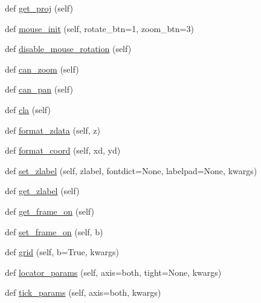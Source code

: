 \begin{DoxyCompactItemize}
\item 
def \hyperlink{classmplot3d_1_1axes3d_1_1Axes3D_a4d20d133a4aa36f0f6beb83e50779e78}{get\+\_\+proj} (self)
\item 
def \hyperlink{classmplot3d_1_1axes3d_1_1Axes3D_a62b6f8a4ada530fadae25b1705e400d3}{mouse\+\_\+init} (self, rotate\+\_\+btn=1, zoom\+\_\+btn=3)
\item 
def \hyperlink{classmplot3d_1_1axes3d_1_1Axes3D_a1072080d0f8fae58f321d962f7463fc7}{disable\+\_\+mouse\+\_\+rotation} (self)
\item 
def \hyperlink{classmplot3d_1_1axes3d_1_1Axes3D_aa68564a9243fcbe69c508e446bcfd271}{can\+\_\+zoom} (self)
\item 
def \hyperlink{classmplot3d_1_1axes3d_1_1Axes3D_afd731a88dde18af49d60297a7c391ce5}{can\+\_\+pan} (self)
\item 
def \hyperlink{classmplot3d_1_1axes3d_1_1Axes3D_ab17183aeda6f48be98ea8484ea81a3b0}{cla} (self)
\item 
def \hyperlink{classmplot3d_1_1axes3d_1_1Axes3D_adb6fe9213e85b7c4e28266884e266604}{format\+\_\+zdata} (self, z)
\item 
def \hyperlink{classmplot3d_1_1axes3d_1_1Axes3D_a116c4c0024c5a0ab00bf0eddf47059a7}{format\+\_\+coord} (self, xd, yd)
\item 
def \hyperlink{classmplot3d_1_1axes3d_1_1Axes3D_ab628b523ccfeebc76ca829168a5d99f2}{set\+\_\+zlabel} (self, zlabel, fontdict=None, labelpad=None, kwargs)
\item 
def \hyperlink{classmplot3d_1_1axes3d_1_1Axes3D_a9b5081e170ee8e955ef79f92b0c5ebac}{get\+\_\+zlabel} (self)
\item 
def \hyperlink{classmplot3d_1_1axes3d_1_1Axes3D_acd6db33adfbf7341ebe59f9fea0f70cc}{get\+\_\+frame\+\_\+on} (self)
\item 
def \hyperlink{classmplot3d_1_1axes3d_1_1Axes3D_a8fbdf85e4d3551aca38671550a17d4b1}{set\+\_\+frame\+\_\+on} (self, b)
\item 
def \hyperlink{classmplot3d_1_1axes3d_1_1Axes3D_a21f1f98c865aaa7c19714fa8be3e6f57}{grid} (self, b=True, kwargs)
\item 
def \hyperlink{classmplot3d_1_1axes3d_1_1Axes3D_a58b3d7431fe2e9832e903a29b8882158}{locator\+\_\+params} (self, axis=\textquotesingle{}both\textquotesingle{}, tight=None, kwargs)
\item 
def \hyperlink{classmplot3d_1_1axes3d_1_1Axes3D_a00bb00d8626eb76ff5874b6e7942ae67}{tick\+\_\+params} (self, axis=\textquotesingle{}both\textquotesingle{}, kwargs)
\item 

\end{DoxyCompactItemize}
